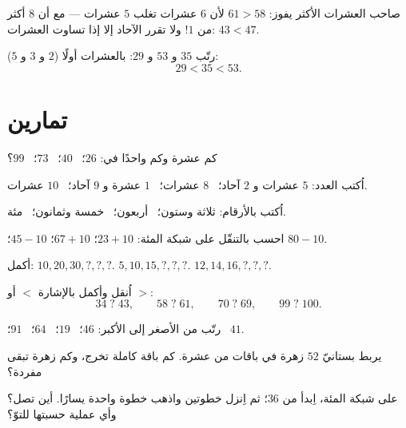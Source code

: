 \begin{method}\label{met:g1:tens:compare}
صاحب العشرات الأكثر يفوز: $61 > 58$ لأن $6$ عشرات تغلب $5$
عشرات --- مع أن $8$ أكثر من $1$! ولا تقرر الآحاد إلا إذا تساوت
العشرات: $43 < 47$.
\end{method}

\begin{example}\label{ex:g1:tens:compare}
رتّب $35$ و $53$ و $29$: بالعشرات أولًا ($2$ و $3$ و $5$):
\[
29 < 35 < 53 .
\]
\end{example}

\section{تمارين}

\begin{exercise}[$\star$]\label{exo:g1:tens:1}
كم عشرة وكم واحدًا في: $26$؛ \ $40$؛ \ $73$؛ \ $99$؟
\end{exercise}

\begin{exercise}[$\star$]\label{exo:g1:tens:2}
اُكتب العدد: $5$ عشرات و $2$ آحاد؛ \ $8$ عشرات؛ \ $1$ عشرة
و $9$ آحاد؛ \ $10$ عشرات.
\end{exercise}

\begin{exercise}[$\star$]\label{exo:g1:tens:3}
اُكتب بالأرقام: ثلاثة وستون؛ \ أربعون؛ \ خمسة وثمانون؛ \
مئة.
\end{exercise}

\begin{exercise}[$\star$]\label{exo:g1:tens:4}
احسب بالتنقّل على شبكة المئة: $23 + 10$؛ \quad $67 + 10$؛
\quad $45 - 10$؛ \quad $80 - 10$.
\end{exercise}

\begin{exercise}[$\star$]\label{exo:g1:tens:5}
أكمل: $10, 20, 30, ?, ?, ?$. \quad
$5, 10, 15, ?, ?, ?$. \quad $12, 14, 16, ?, ?, ?$.
\end{exercise}

\begin{exercise}[$\star$]\label{exo:g1:tens:6}
اُنقل وأكمل بالإشارة $<$ أو $>$:
\[
34 \;?\; 43, \qquad
58 \;?\; 61, \qquad
70 \;?\; 69, \qquad
99 \;?\; 100 .
\]
\end{exercise}

\begin{exercise}[$\star$]\label{exo:g1:tens:7}
رتّب من الأصغر إلى الأكبر: $46$؛ \ $19$؛ \ $64$؛ \ $91$؛ \
$41$.
\end{exercise}

\begin{exercise}[$\star$]\label{exo:g1:tens:8}
يربط بستانيّ $52$ زهرة في باقات من عشرة. كم باقة كاملة تخرج، وكم
زهرة تبقى مفردة؟
\end{exercise}

\begin{exercise}[$\star\star$]\label{exo:g1:tens:9}
على شبكة المئة، اِبدأ من $36$؛ ثم اِنزل خطوتين واذهب خطوة واحدة
يسارًا. أين تصل؟ وأي عملية حسبتها للتوّ؟
\end{exercise}
